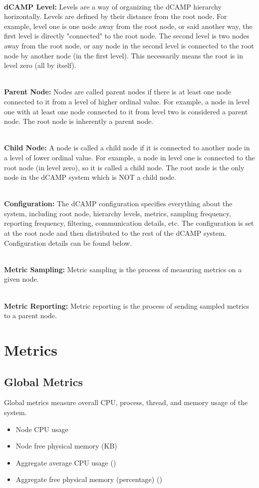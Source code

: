 ~\\ \textbf{dCAMP Level:} Levels are a way of organizing the dCAMP hierarchy horizontally. Levels are defined by their distance from the root node. For example, level one is one node away from the root node, or said another way, the first level is directly "connected" to the root node. The second level is two nodes away from the root node, or any node in the second level is connected to the root node by another node (in the first level). This necessarily means the root is in level zero (all by itself). 

~\\ \textbf{Parent Node:} Nodes are called parent nodes if there is at least one node connected to it from a level of higher ordinal value. For example, a node in level one with at least one node connected to it from level two is considered a parent node. The root node is inherently a parent node. 

~\\ \textbf{Child Node:} A node is called a child node if it is connected to another node in a level of lower ordinal value. For example, a node in level one is connected to the root node (in level zero), so it is called a child node. The root node is the only node in the dCAMP system which is NOT a child node. 

~\\ \textbf{Configuration:} The dCAMP configuration specifies everything about the system, including root node, hierarchy levels, metrics, sampling frequency, reporting frequency, filtering, communication details, etc. The configuration is set at the root node and then distributed to the rest of the dCAMP system. Configuration details can be found below. 

~\\ \textbf{Metric Sampling:} Metric sampling is the process of measuring metrics on a given node. 

~\\ \textbf{Metric Reporting:} Metric reporting is the process of sending sampled metrics to a parent node.

\section{\dcamp Metrics}
\subsection{Global Metrics}
Global metrics measure overall CPU, process, thread, and memory usage of the system.
\begin{itemize}
\item Node CPU usage 
\item Node free physical memory (KB) 
\item Aggregate average CPU usage (\dcamp) 
\item Aggregate free physical memory (percentage) (\dcamp)
\end{itemize}


